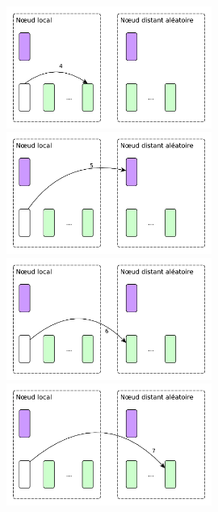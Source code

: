 \documentclass[xcolor={usenames,dvipsnames,svgnames,table}, aspectratio=43]{beamer}
\begin{document}
\begin{frame}
\begin{figure}
{  }%
   {%
    \includegraphics[width=0.6\textwidth]{graph/steal_strategies_anim_4.pdf}%
  }%
   {%
    \includegraphics[width=0.6\textwidth]{graph/steal_strategies_anim_5.pdf}%
  }%
   {%
    \includegraphics[width=0.6\textwidth]{graph/steal_strategies_anim_6.pdf}%
  }%
   {%
    \includegraphics[width=0.6\textwidth]{graph/steal_strategies_anim_7.pdf}%
  }%
\end{figure}

\end{frame}
\end{document}
